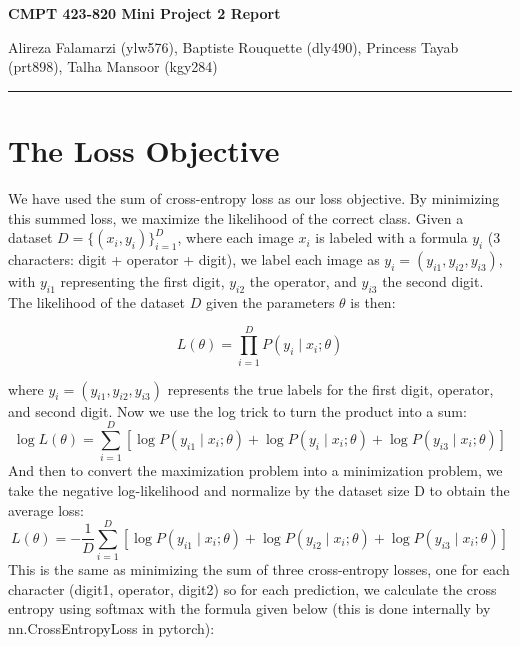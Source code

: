 \documentclass{article}
\begin{document}
\begin{centering}
\Large\textbf{{\sc CMPT 423-820 Mini Project 2 Report}}\\[1ex]
\begin{center}
\small{Alireza Falamarzi (ylw576), Baptiste Rouquette (dly490), Princess Tayab (prt898), Talha Mansoor (kgy284)}
\end{center}
\end{centering}
\hrule


\section{The Loss Objective}
We have used the sum of cross-entropy loss as our loss objective. By minimizing this summed loss, we maximize the likelihood of the correct class. Given a dataset \( D = \{ (x_{i}, y_{i}) \}_{i=1}^{D} \), where each image \( x_i \) is labeled with a formula \( y_i \) (3 characters: digit + operator + digit), we label each image as \( y_i = (y_{i1}, y_{i2}, y_{i3}) \), with \( y_{i1} \) representing the first digit, \( y_{i2} \) the operator, and \( y_{i3} \) the second digit. The likelihood of the dataset \( D \) given the parameters \( \theta \) is then:

\begin{equation}
L(\theta) = \prod_{i=1}^{D} P(y_i \mid x_i; \theta)
\end{equation}

\noindent where \( y_i = (y_{i1}, y_{i2}, y_{i3}) \) represents the true labels for the first digit, operator, and second digit. Now we use the log trick  to turn the product into a sum:
\begin{equation}
\log L(\theta) = \sum_{i=1}^{D} \left[ \log P(y_{i1} \mid x_i; \theta) + \log P(y_i \mid x_i; \theta) + \log P(y_{i3} \mid x_i; \theta) \right]
\end{equation}
And then to convert the maximization problem into a minimization problem, we take the negative log-likelihood and normalize by the dataset size D to obtain the average loss:
\begin{equation}
L(\theta) = -\frac{1}{D} \sum_{i=1}^{D} \left[ \log P(y_{i1} \mid x_i; \theta) + \log P(y_{i2} \mid x_i; \theta) + \log P(y_{i3} \mid x_i; \theta) \right]
\end{equation}
This is the same as minimizing the sum of three cross-entropy losses, one for each character (digit1, operator, digit2) so for each prediction, we calculate the cross entropy using softmax with the formula given below (this is done internally by
nn.CrossEntropyLoss in pytorch):
\end{document}

